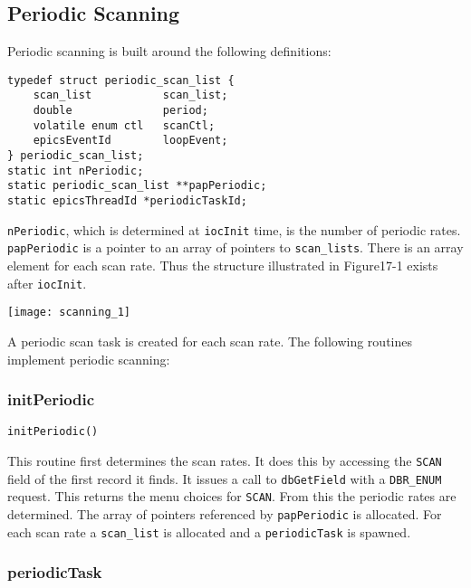 \subsection{Periodic Scanning}

Periodic scanning is built around the following definitions:

\begin{verbatim}
typedef struct periodic_scan_list {
    scan_list           scan_list;
    double              period;
    volatile enum ctl   scanCtl;
    epicsEventId        loopEvent;
} periodic_scan_list;
static int nPeriodic;
static periodic_scan_list **papPeriodic;
static epicsThreadId *periodicTaskId;
\end{verbatim}

\verb|nPeriodic|, which is determined at \verb|iocInit| time, is the number of periodic rates. \verb|papPeriodic| is a pointer to an 
array of pointers to \verb|scan_lists|. There is an array element for each scan rate. Thus the structure illustrated in 
Figure17-1 exists after \verb|iocInit|.

\begin{center}
\texttt{[image: scanning\_1]}
\end{center}

A periodic scan task is created for each scan rate. The following routines implement periodic scanning:

\subsubsection{initPeriodic}

\begin{verbatim}
initPeriodic()
\end{verbatim}

This routine first determines the scan rates. It does this by accessing the \verb|SCAN| field of the first record it finds. It issues a 
call to \verb|dbGetField| with a \verb|DBR_ENUM| request. This returns the menu choices for \verb|SCAN|. From this the periodic rates are 
determined. The array of pointers referenced by \verb|papPeriodic| is allocated. For each scan rate a \verb|scan_list| is 
allocated and a \verb|periodicTask| is spawned.

\subsubsection{periodicTask}

